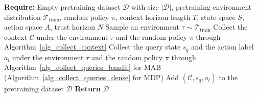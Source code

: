 \documentclass[10pt]{article}
\def\ccalC{{\ensuremath{\mathcal C}}}
\def\ccalD{{\ensuremath{\mathcal D}}}
\def\ccalT{{\ensuremath{\mathcal T}}}
\begin{document}
\begin{algorithm}[ht]
\caption{State-Action Distillation (SAD) under Random Policy}
\label{alg_sad}
\begin{algorithmic}[1]
		\STATE \textbf{Require:} Empty pretraining dataset $\ccalD$ with size $|\ccalD|$, pretraining environment distribution $\ccalT_{\text{train}}$, random policy $\pi$, context horizon length $T$, state space $S$, action space $A$, trust horizon $N$
        \FOR{$i$ in $[|\ccalD|]$}
            \STATE Sample an environment $\tau \sim \ccalT_{\text{train}}$
            \STATE Collect the context $\ccalC$ under the environment $\tau$ and the random policy $\pi$ through Algorithm~\ref{alg_collect_context}
            \STATE Collect the query state $s_q$ and the action label $a_l$ under the environment $\tau$ and the random policy $\pi$ through Algorithm~\ref{alg_collect_queries_bandit} for MAB (Algorithm~\ref{alg_collect_queries_dense} for MDP)
            \STATE Add $(\ccalC, s_q, a_l)$ to the pretraining dataset $\ccalD$
        \ENDFOR
        \STATE \textbf{Return} $\ccalD$
\end{algorithmic}
\end{algorithm}
\end{document}
